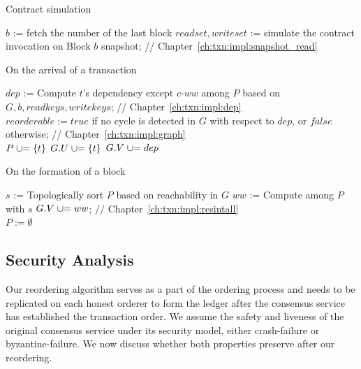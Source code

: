 \begin{algorithm}
  \caption{Contract simulation}
  \label{alg:txn:simulation}
  $b$ := fetch the number of the last block\;
  $readset, writeset$ := simulate the contract invocation on Block $b$
  snapshot; \hfill {// Chapter~\ref{ch:txn:impl:snapshot_read}}
\end{algorithm}


\begin{algorithm}[tp]
  \caption{On the arrival of a transaction}
  \label{alg:txn:txn}
  $dep$ := Compute $t$'s dependency except $c$-$ww$ among $P$ based on $G, b, readkeys,
  writekeys$; \hfill {// Chapter~\ref{ch:txn:impl:dep}}\\
  $reorderable := true$ if no cycle is detected in $G$ with respect to $dep$,
  or $false$ otherwise;
  \hfill {// Chapter~\ref{ch:txn:impl:graph}}\\
   {
    $P \mathrel{{\cup}{=}} \{t\}$\;
    $G.U \mathrel{{\cup}{=}} \{t\}$\;
    $G.V \mathrel{{\cup}{=}} dep$\;
  }
\end{algorithm}

\begin{algorithm}
  \caption{On the formation of a block}
  \label{alg:txn:blk}
  $s$ := Topologically sort $P$ based on reachability in $G$\;
  $ww$ := Compute  among $P$ with $s$\;
  $G.V \mathrel{{\cup}{=}} ww$;  \hfill {// Chapter~\ref{ch:txn:impl:resintall}} \\
  $P := \emptyset$
\end{algorithm}

\subsection{Security Analysis}
\label{ch:txn:securityanalysis}
Our reordering algorithm serves as a part of the ordering process and needs to be replicated on each honest orderer to form the ledger after the consensus service has established the transaction order. 
%
We assume the safety and liveness of the original consensus service under its security model, either crash-failure or byzantine-failure.
%
We now discuss whether both properties preserve after our reordering. 

